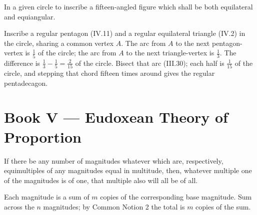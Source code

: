\documentclass{rrxiv}
\begin{document}
\begin{claim}
\label{prop:IV.16}
In a given circle to inscribe a fifteen-angled figure which shall be
both equilateral and equiangular.
\end{claim}
\begin{evidence}[Proof of IV.16]
\label{ev:IV.16}
Inscribe a regular pentagon (IV.11) and a regular equilateral
triangle (IV.2) in the circle, sharing a common vertex $A$.  The arc
from $A$ to the next pentagon-vertex is $\tfrac{1}{5}$ of the circle;
the arc from $A$ to the next triangle-vertex is $\tfrac{1}{3}$.  The
difference is $\tfrac{1}{3} - \tfrac{1}{5} = \tfrac{2}{15}$ of the
circle.  Bisect that arc (III.30); each half is $\tfrac{1}{15}$ of
the circle, and stepping that chord fifteen times around gives the
regular pentadecagon.
\end{evidence}
%
%

\section{Book V --- Eudoxean Theory of Proportion}
\label{sec:book-V}

\begin{claim}
\label{prop:V.1}
If there be any number of magnitudes whatever which are, respectively,
equimultiples of any magnitudes equal in multitude, then, whatever
multiple one of the magnitudes is of one, that multiple also will all
be of all.
\end{claim}
\begin{evidence}[Proof of V.1]
\label{ev:V.1}
Each magnitude is a sum of $m$ copies of the corresponding base
magnitude.  Sum across the $n$ magnitudes; by Common Notion 2 the
total is $m$ copies of the sum.
\end{evidence}
\end{document}
